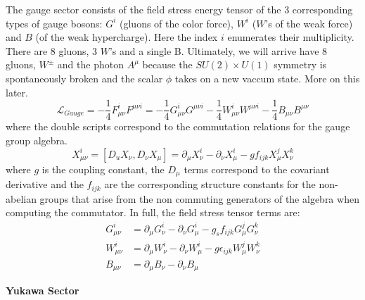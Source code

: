 The gauge sector consists of the field stress energy tensor of the 3 corresponding types of gauge bosons:
 $G^i$ (gluons of the color force), $W^i$ ($W$'s of the weak force) and $B$ (of the weak hypercharge). Here the index $i$ enumerates their multiplicity. There are 8 gluons, 3 $W$'s and a single B. Ultimately, we will arrive have 8 gluons, $W^{\pm}$ and the photon $A^\mu$ because the $SU(2)\times U(1)$ 
symmetry is spontaneously broken and the scalar $\phi$ takes on a new vaccum state. More on this later.
\begin{equation}
\mathcal{L}_{Gauge} = - \frac{1}{4} F_{\mu\nu}^{i} F^{\mu\nu i} =  - \frac{1}{4} G_{\mu\nu}^{i} G^{\mu\nu i} - \frac{1}{4} W^{i}_{\mu\nu} W^{\mu\nu i} - \frac{1}{4} B_{\mu\nu}B^{\mu\nu} 
\end{equation}
where the double scripts correspond to the commutation relations for the gauge group algebra. 
\begin{equation}
X_{\mu\nu}^i   = [D_u X_\nu, D_\nu X_\mu] = \partial_\mu X_\nu^i - \partial_\nu X_\mu^i - g f_{ijk} X_\mu^j X_\nu^k
\end{equation}
where $g$ is the coupling constant, the $D_\mu$ terms correspond to the covariant derivative and the $f_{ijk}$ are the corresponding structure constants for the non-abelian groups that arise from the non commuting generators of the algebra when computing the commutator. In full, the field stress tensor terms are:
\begin{align*}
G_{\mu\nu}^i &=  \partial_\mu G_\nu^i - \partial_\nu G_\mu^i - g_s f_{ijk} G_\mu^j G_\nu^k\\ 
W_{\mu\nu}^i &=  \partial_\mu W_\nu^i - \partial_\nu W_\mu^i - g \epsilon_{ijk} W_\mu^j W_\nu^k\\ 
B_{\mu\nu} &=  \partial_\mu B_\nu - \partial_\nu B_\mu
\end{align*}

\textbf{Yukawa Sector}

